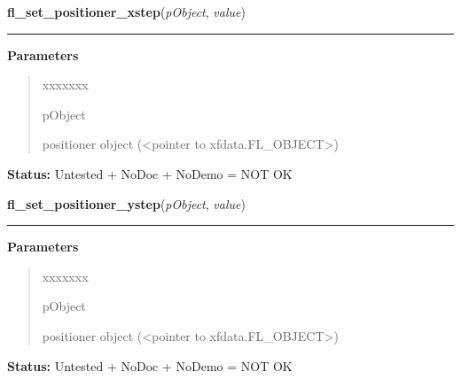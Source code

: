 \hspace{.8\funcindent}\begin{boxedminipage}{\funcwidth}

    \raggedright \textbf{fl\_set\_positioner\_xstep}(\textit{pObject}, \textit{value})

    \vspace{-1.5ex}

    \rule{\textwidth}{0.5\fboxrule}
\setlength{\parskip}{2ex}
\setlength{\parskip}{1ex}
      \textbf{Parameters}
      \vspace{-1ex}

      \begin{quote}
        \begin{Ventry}{xxxxxxx}

          \item[pObject]

          positioner object ({\textless}pointer to 
          xfdata.FL\_OBJECT{\textgreater})

        \end{Ventry}

      \end{quote}

\textbf{Status:} Untested + NoDoc + NoDemo = NOT OK



    \end{boxedminipage}

    \label{xformslib:library:fl_set_positioner_ystep}

    \vspace{0.5ex}

\hspace{.8\funcindent}\begin{boxedminipage}{\funcwidth}

    \raggedright \textbf{fl\_set\_positioner\_ystep}(\textit{pObject}, \textit{value})

    \vspace{-1.5ex}

    \rule{\textwidth}{0.5\fboxrule}
\setlength{\parskip}{2ex}
\setlength{\parskip}{1ex}
      \textbf{Parameters}
      \vspace{-1ex}

      \begin{quote}
        \begin{Ventry}{xxxxxxx}

          \item[pObject]

          positioner object ({\textless}pointer to 
          xfdata.FL\_OBJECT{\textgreater})

        \end{Ventry}

      \end{quote}

\textbf{Status:} Untested + NoDoc + NoDemo = NOT OK



    \end{boxedminipage}

